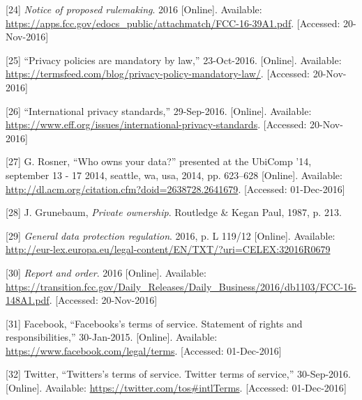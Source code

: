 \documentclass[12pt,english,a4paper,titlepage,cleardoublepage=empty,dottedtoc]{report}
\begin{document}
\hypertarget{ref-rules_2016_fcc_to-protect-broadband-consumer-privacy_personally-identifiable-information}{}
{[}24{]} \emph{Notice of proposed rulemaking}. 2016 {[}Online{]}.
Available:
\url{https://apps.fcc.gov/edocs_public/attachmatch/FCC-16-39A1.pdf}.
{[}Accessed: 20-Nov-2016{]}

\hypertarget{ref-web_2016_privacy-policies-are-mandatory-by-law}{}
{[}25{]} ``Privacy policies are mandatory by law,'' 23-Oct-2016.
{[}Online{]}. Available:
\url{https://termsfeed.com/blog/privacy-policy-mandatory-law/}.
{[}Accessed: 20-Nov-2016{]}

\hypertarget{ref-web_2016_international-privacy-standards}{}
{[}26{]} ``International privacy standards,'' 29-Sep-2016. {[}Online{]}.
Available:
\url{https://www.eff.org/issues/international-privacy-standards}.
{[}Accessed: 20-Nov-2016{]}

\hypertarget{ref-paper_2014_who-owns-yours-data}{}
{[}27{]} G. Rosner, ``Who owns your data?'' presented at the UbiComp
'14, september 13 - 17 2014, seattle, wa, usa, 2014, pp. 623--628
{[}Online{]}. Available:
\url{http://dl.acm.org/citation.cfm?doid=2638728.2641679}. {[}Accessed:
01-Dec-2016{]}

\hypertarget{ref-book_1987_private-ownership_definition}{}
{[}28{]} J. Grunebaum, \emph{Private ownership}. Routledge \& Kegan
Paul, 1987, p. 213.

\hypertarget{ref-regulation_2016_eu_general-data-protection-regulation_ownership}{}
{[}29{]} \emph{General data protection regulation}. 2016, p. L 119/12
{[}Online{]}. Available:
\url{http://eur-lex.europa.eu/legal-content/EN/TXT/?uri=CELEX:32016R0679}

\hypertarget{ref-rules_2016_fcc_to-protect-broadband-consumer-privacy_ownership}{}
{[}30{]} \emph{Report and order}. 2016 {[}Online{]}. Available:
\url{https://transition.fcc.gov/Daily_Releases/Daily_Business/2016/db1103/FCC-16-148A1.pdf}.
{[}Accessed: 20-Nov-2016{]}

\hypertarget{ref-web_2016_facebook_terms-of-service}{}
{[}31{]} Facebook, ``Facebooks's terms of service. Statement of rights
and responsibilities,'' 30-Jan-2015. {[}Online{]}. Available:
\url{https://www.facebook.com/legal/terms}. {[}Accessed: 01-Dec-2016{]}

\hypertarget{ref-web_2016_twitter_terms-of-service}{}
{[}32{]} Twitter, ``Twitters's terms of service. Twitter terms of
service,'' 30-Sep-2016. {[}Online{]}. Available:
\url{https://twitter.com/tos\#intlTerms}. {[}Accessed: 01-Dec-2016{]}
\end{document}
